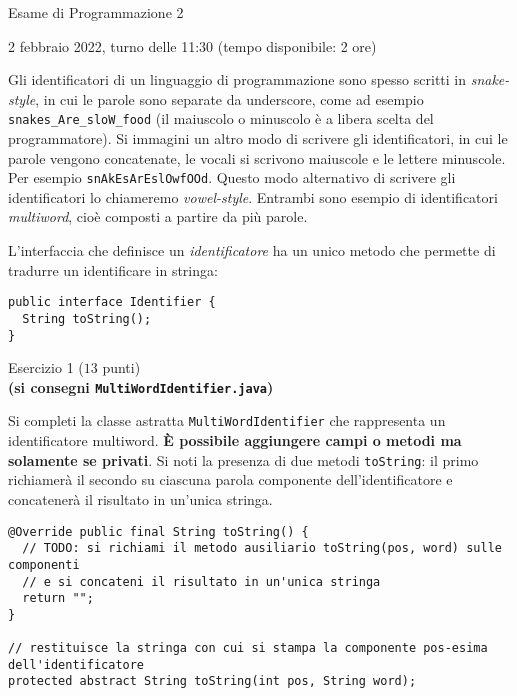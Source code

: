 \documentclass[12pt]{article}
\begin{document}
\begin{center}{\LARGE Esame di Programmazione 2}\\
\begin{center}
  \large 2 febbraio 2022, turno delle 11:30 (tempo disponibile: 2 ore)
\end{center}
\end{center}

Gli identificatori di un linguaggio di programmazione sono spesso scritti
in \emph{snake-style}, in cui le parole sono separate da
underscore, come ad esempio \texttt{snakes\_Are\_sloW\_food}
(il maiuscolo o minuscolo \`e a libera scelta del programmatore).
Si immagini un altro modo di scrivere gli identificatori, in cui le parole
vengono concatenate, le vocali si scrivono maiuscole e le lettere minuscole.
Per esempio \texttt{snAkEsArEslOwfOOd}. Questo modo alternativo di scrivere
gli identificatori lo chiameremo \emph{vowel-style}.
Entrambi sono esempio di identificatori \emph{multiword}, cio\`e composti
a partire da pi\`u parole.

L'interfaccia che definisce un \emph{identificatore} ha un unico metodo che
permette di tradurre un identificare in stringa:

{\small\begin{verbatim}
public interface Identifier {
  String toString();
}
\end{verbatim}}

\vspace*{1ex}
\begin{center}{\Large Esercizio 1} ($13$ punti)\\
  \textbf{(si consegni \texttt{MultiWordIdentifier.java})}
\end{center}

Si completi la classe astratta \texttt{MultiWordIdentifier} che rappresenta
un identificatore multiword.
\textbf{\`E possibile aggiungere campi o metodi ma solamente se privati}.
Si noti la presenza di due metodi \texttt{toString}:
il primo richiamer\`a il secondo su ciascuna parola componente dell'identificatore
e concatener\`a il risultato in un'unica stringa.

{\small\begin{verbatim}
@Override public final String toString() {
  // TODO: si richiami il metodo ausiliario toString(pos, word) sulle componenti
  // e si concateni il risultato in un'unica stringa
  return "";
}

// restituisce la stringa con cui si stampa la componente pos-esima dell'identificatore
protected abstract String toString(int pos, String word);
\end{verbatim}}
\end{document}

